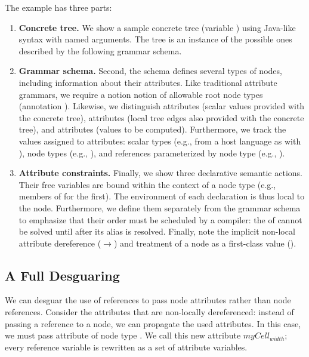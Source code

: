 The example has three parts:

\begin{enumerate}
\item \textbf{Concrete tree.} We show a sample concrete tree (variable ) using Java-like syntax with named arguments. The tree is an instance of the possible ones described by the following grammar schema. 

\item \textbf{Grammar schema.} Second, the schema defines several types of nodes, including information about their attributes. Like traditional attribute grammars, we require a notion notion of allowable root node types (annotation ). Likewise, we distinguish  attributes (scalar values provided with the concrete tree),  attributes (local tree edges also provided with the concrete tree), and  attributes (values to be computed). Furthermore, we track the values assigned to attributes: scalar types (e.g., from a host language as with ), node types (e.g., ), and references parameterized by node type (e.g., ).

\item \textbf{Attribute constraints.} Finally, we show three declarative semantic actions. Their free variables are bound within the context of a node type (e.g., members of  for the first).  The environment of each declaration is thus local to the node. Furthermore, we define them separately from the grammar schema to emphasize that their order must be scheduled by a compiler: the  of  cannot be solved until after its alias  is resolved. Finally, note the implicit non-local attribute dereference ($\rightarrow$) and treatment of a node as a first-class value ().
\end{enumerate}

\subsection{A Full Desguaring}
We can desguar the use of references to pass node attributes rather than node references. Consider the attributes that are non-locally dereferenced: instead of passing a reference to a node, we can propagate the used attributes. In this case, we must pass attribute  of node type . We call this new attribute $myCell_{width}$; every reference variable is rewritten as a set of attribute variables.

